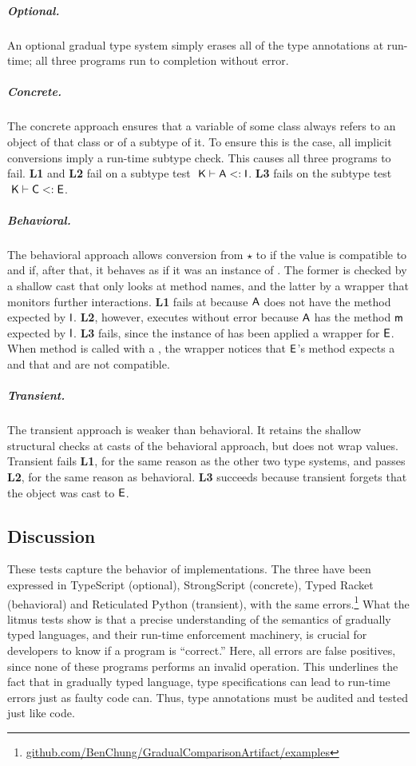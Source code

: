 \documentclass[a4paper,USenglish]{lipics-v2018}
\newcommand{\EM}[1]{\ensuremath{#1}\xspace}
\newcommand{\xt}[1]{{\sf{#1}}}
\newcommand{\EMxt}[1]{\EM{\xt{#1}}}
\newcommand{\m}{\EMxt m}
\newcommand{\K}{\EMxt K}
\newcommand{\A}{\EMxt {A}}
\newcommand{\I}{\EMxt {I}}
\newcommand{\E}{\EMxt {E}}
\newcommand{\any}{\EM{\star}}
\newcommand{\Sub}{\EM{<:}}
\newcommand{\StrSub}[4]{\EM{#1~#2\vdash #3\Sub #4}}
\newcounter{lem}
\begin{document}
\subparagraph*{Optional.} An optional gradual type system simply erases all of the
type annotations at run-time; all three programs run to completion without
error.

\subparagraph*{Concrete.} The concrete approach ensures that a
variable of some class \C always refers to an object of that class or of a
subtype of it. To ensure this is the case, all implicit conversions imply a
run-time subtype check. This causes all three programs to fail. {\bf L1}
and {\bf L2} fail on a subtype test \StrSub{}\K\A\I. {\bf L3} fails on the
subtype test \StrSub{}\K\C\E.

\subparagraph*{Behavioral.} The behavioral approach allows
conversion from \any to \C if the value is compatible to \C and if,
after that, it behaves as if it was an instance of \C. The former is
checked by a shallow cast that only looks at method names, and the
latter by a wrapper that monitors further interactions. {\bf L1} fails at
because \A does not have the method \xt n expected by \I. {\bf L2}, however,
executes without error because \A has the method \m expected by \I. {\bf L3} fails, since the instance of \C has been applied
a wrapper for \E. When method \a is called with a \C, the wrapper notices
that \E's method \a expects a \D and that \C and \D are not compatible.

\subparagraph*{Transient.} The transient approach is weaker
than behavioral. It retains the shallow structural checks at casts of the
behavioral approach, but does not wrap values. Transient fails {\bf L1}, for
the same reason as the other two type systems, and passes {\bf L2}, for the
same reason as behavioral. {\bf L3} succeeds because transient forgets that
the \C object was cast to \E.

\subsection{Discussion}

These tests capture the behavior of implementations. The three have been
expressed in TypeScript (optional), StrongScript (concrete), Typed Racket
(behavioral) and Reticulated Python (transient), with the same
errors.\footnote{\url{github.com/BenChung/GradualComparisonArtifact/examples}}
What the litmus tests show is that a precise understanding of the semantics
of gradually typed languages, and their run-time enforcement machinery, is
crucial for developers to know if a program is ``correct.'' Here, all
errors are false positives, since none of these programs performs an invalid
operation. This underlines the fact that in gradually typed language, type
specifications can lead to run-time errors just as faulty code can. Thus,
type annotations must be audited and tested just like code.
\end{document}
